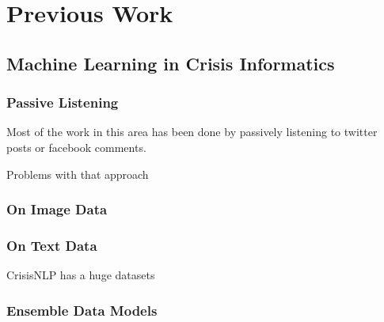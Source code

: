 \chapter{Previous Work} 

\section{Machine Learning in Crisis Informatics}

\subsection{Passive Listening}
Most of the work in this area has been done by passively listening to twitter
posts or facebook comments. 

Problems with that approach

\subsection{On Image Data}


\subsection{On Text Data}

CrisisNLP has a huge datasets 

\subsection{Ensemble Data Models}
